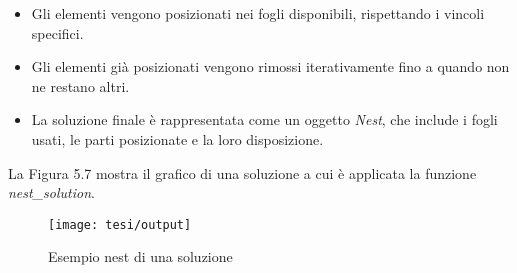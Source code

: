 \begin{itemize}
    \item Gli elementi vengono posizionati nei fogli disponibili, rispettando i vincoli specifici.
    \item Gli elementi già posizionati vengono rimossi iterativamente fino a quando non ne restano altri.
    \item La soluzione finale è rappresentata come un oggetto \emph{Nest}, che include i fogli usati, le parti posizionate e la loro disposizione.
\end{itemize}

La Figura 5.7 mostra il grafico di una soluzione a cui è applicata la funzione \emph{nest\_solution}.

\begin{figure}[!ht] 
    \centering 
    \texttt{[image: tesi/output]} 
    \caption{Esempio nest di una soluzione}
\end{figure}
















